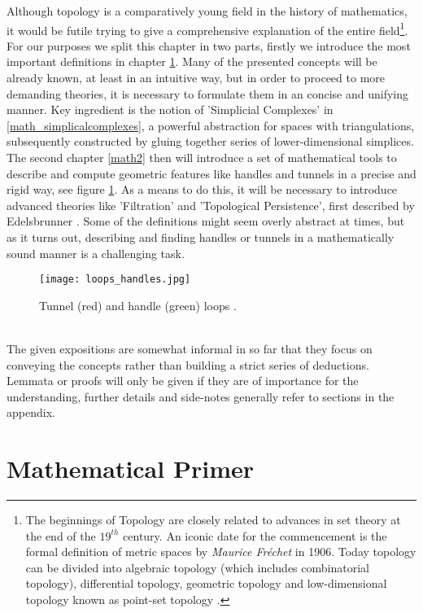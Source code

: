 Although topology is a comparatively young field in the history of mathematics, it would be futile trying to give a comprehensive explanation of the entire field\footnote{ The beginnings of Topology are closely related to advances in set theory at the end of the $19^{th}$ century. An iconic date for the commencement is the formal definition of metric spaces by \textit{Maurice Fréchet} in 1906. Today topology can be divided into algebraic topology (which includes combinatorial topology), differential topology, geometric topology and low-dimensional topology known as point-set topology \citep[][cf. p.2]{Weisstein2012}.}.\\
For our purposes we split this chapter in two parts, firstly we introduce the most important definitions in chapter \ref{math1}.
Many of the presented concepts will be already known, at least in an intuitive way, but in order to proceed to more demanding theories, it is necessary to formulate them in an concise and unifying manner.
Key ingredient is the notion of 'Simplicial Complexes' in \ref{math_simplicalcomplexes}, a powerful abstraction for spaces with triangulations, subsequently constructed by gluing together series of lower-dimensional simplices.\\
The second chapter \ref{math2} then will introduce a set of mathematical tools to describe and compute geometric features like handles and tunnels in a precise and rigid way, see figure \ref{fig:loops_handles}.
As a means to do this, it will be necessary to introduce advanced theories like 'Filtration' and 'Topological Persistence', first described by Edelsbrunner \citep[cf.][]{Edelsbrunner2000}.
Some of the definitions might seem overly abstract at times, but as it turns out, describing and finding handles or tunnels in a mathematically sound manner is a challenging task.
\begin{figure}[ht]
\centering
\texttt{[image: loops\_handles.jpg]}
\caption{Tunnel (red) and handle (green) loops \citep[cf.][]{Dey2012}.}
\label{fig:loops_handles}
\end{figure}\\
The given expositions are somewhat informal in so far that they focus on conveying the concepts rather than building a strict series of deductions.
Lemmata or proofs will only be given if they are of importance for the understanding, further details and side-notes generally refer to sections in the appendix.

\section{Mathematical Primer}
\label{math1}

